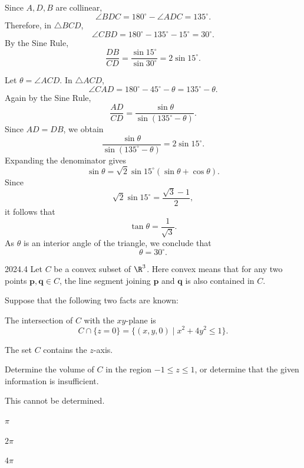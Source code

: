 \begin{solutions}
        \begin{solution}
        Since $A,D,B$ are collinear,
        \[
            \angle BDC
            =
            180^\circ-\angle ADC
            =
            135^\circ.
        \]
        Therefore, in $\triangle BCD$,
        \[
            \angle CBD
            =
            180^\circ-135^\circ-15^\circ
            =
            30^\circ.
        \]
        By the Sine Rule,
        \[
            \frac{DB}{CD}
            =
            \frac{\sin 15^\circ}{\sin 30^\circ}
            =
            2\sin 15^\circ.
        \]

        Let $\theta=\angle ACD$. In $\triangle ACD$,
        \[
            \angle CAD
            =
            180^\circ-45^\circ-\theta
            =
            135^\circ-\theta.
        \]
        Again by the Sine Rule,
        \[
            \frac{AD}{CD}
            =
            \frac{\sin\theta}{\sin(135^\circ-\theta)}.
        \]
        Since $AD=DB$, we obtain
        \[
            \frac{\sin\theta}{\sin(135^\circ-\theta)}
            =
            2\sin 15^\circ.
        \]
        Expanding the denominator gives
        \[
            \sin\theta
            =
            \sqrt{2}\sin 15^\circ
            (\sin\theta+\cos\theta).
        \]
        Since
        \[
            \sqrt{2}\sin 15^\circ
            =
            \frac{\sqrt{3}-1}{2},
        \]
        it follows that
        \[
            \tan\theta
            =
            \frac{1}{\sqrt{3}}.
        \]
        As $\theta$ is an interior angle of the triangle, we conclude that
        \[
            \boxed{\theta=30^\circ}.
        \]
        \end{solution}
    \end{solutions}

    \begin{pastproblem}{2024.4}
        Let $C$ be a convex subset of $\R^3$. Here convex means that for any two points
        $\mathbf{p},\mathbf{q}\in C$, the line segment joining $\mathbf{p}$ and $\mathbf{q}$ is also
        contained in $C$.

        Suppose that the following two facts are known:
        \begin{problemchoices}
            \item The intersection of $C$ with the $xy$-plane is
                  \[
                      C\cap\{z=0\}
                      =
                      \{(x,y,0)\mid x^2+4y^2\leq 1\}.
                  \]
            \item The set $C$ contains the $z$-axis.
        \end{problemchoices}
        Determine the volume of $C$ in the region $-1\leq z\leq 1$, or determine that the given
        information is insufficient.
        \begin{problemchoices}
            \item This cannot be determined.
            \item $\pi$
            \item $2\pi$
            \item $4\pi$
        \end{problemchoices}
    \end{pastproblem}

